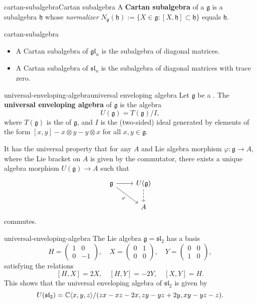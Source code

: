 \begin{topic}{cartan-subalgebra}{Cartan subalgebra}
    A \textbf{Cartan subalgebra} of a  $\mathfrak{g}$ is a  subalgebra $\mathfrak{h}$ whose \textit{normalizer} $N_\mathfrak{g}(\mathfrak{h}) := \{ X \in \mathfrak{g} : [X, \mathfrak{h}] \subset \mathfrak{h} \}$ equals $\mathfrak{h}$.
\end{topic}

\begin{example}{cartan-subalgebra}
    \begin{itemize}
        \item A Cartan subalgebra of $\mathfrak{gl}_n$ is the subalgebra of diagonal matrices.
        \item A Cartan subalgebra of $\mathfrak{sl}_n$ is the subalgebra of diagonal matrices with trace zero.
    \end{itemize}
\end{example}

\begin{topic}{universal-enveloping-algebra}{universal enveloping algebra}
    Let $\mathfrak{g}$ be a . The \textbf{universal enveloping algebra} of $\mathfrak{g}$ is the algebra
    \[ U(\mathfrak{g}) = T(\mathfrak{g}) / I , \]
    where $T(\mathfrak{g})$ is the  of $\mathfrak{g}$, and $I$ is the (two-sided) ideal generated by elements of the form $[x, y] - x \otimes y - y \otimes x$ for all $x, y \in \mathfrak{g}$.
    
    It has the universal property that for any  $A$ and Lie algebra morphism $\varphi \colon \mathfrak{g} \to A$, where the Lie bracket on $A$ is given by the commutator, there exists a unique algebra morphism $U(\mathfrak{g}) \to A$ such that
    \[ \svg \begin{tikzcd} \mathfrak{g} \arrow{r} \arrow[swap]{dr}{\varphi} & U(\mathfrak{g}) \arrow[dashed]{d} \\ & A \end{tikzcd} \]
    commutes.
\end{topic}

\begin{example}{universal-enveloping-algebra}
    The Lie algebra $\mathfrak{g} = \mathfrak{sl}_2$ has a basis
    \[ H = \begin{pmatrix} 1 & 0 \\ 0 & -1 \end{pmatrix}, \quad X = \begin{pmatrix} 0 & 1 \\ 0 & 0 \end{pmatrix}, \quad Y = \begin{pmatrix} 0 & 0 \\ 1 & 0 \end{pmatrix} , \]
    satisfying the relations
    \[ [H, X] = 2X, \quad [H, Y] = -2Y, \quad [X, Y] = H . \]
    This shows that the universal enveloping algebra of $\mathfrak{sl}_2$ is given by
    \[ U(\mathfrak{sl}_2) = \mathbb{C} \langle x, y, z \rangle / (zx - xz - 2x, zy - yz + 2y, xy - yz - z) . \]
\end{example}

